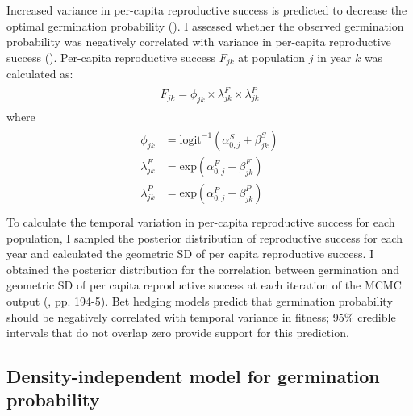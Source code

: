 \documentclass[12pt, oneside, titlepage]{article}   	%
\begin{document}
Increased variance in per-capita reproductive success is predicted to decrease the optimal germination probability (\cite{cohen1966,ellner1985a}). I assessed whether the observed germination probability was negatively correlated with variance in per-capita reproductive success (\cite{venable2007}). Per-capita reproductive success $F_{jk}$ at population $j$ in year $k$ was calculated as:
%
\begin{align}
  \begin{split}
F_{jk} = \phi_{jk} \times \lambda^F_{jk} \times \lambda^P_{jk} \label{eq:percapitars}
  \end{split}
\end{align}
%
where
%
\begin{align}
  \begin{split}
\phi_{jk} & = \mathrm{logit}^{-1}(\alpha^S_{0,j} + \beta^S_{jk}) \\
\lambda^F_{jk} & = \mathrm{exp}(\alpha^F_{0,j} + \beta^F_{jk}) \\
\lambda^P_{jk} & = \mathrm{exp}(\alpha^P_{0,j} + \beta^P_{jk}) \\
  \end{split}
\end{align}
%
To calculate the temporal variation in per-capita reproductive success for each population, I sampled the posterior distribution of reproductive success for each year and calculated the geometric SD of per capita reproductive success. I obtained the posterior distribution for the correlation between germination and geometric SD of per capita reproductive success at each iteration of the MCMC output (\cite{hobbs2015b}, pp. 194-5). Bet hedging models predict that germination probability should be negatively correlated with temporal variance in fitness; 95\% credible intervals that do not overlap zero provide support for this prediction. %

\subsection{Density-independent model for germination probability}
\end{document}
